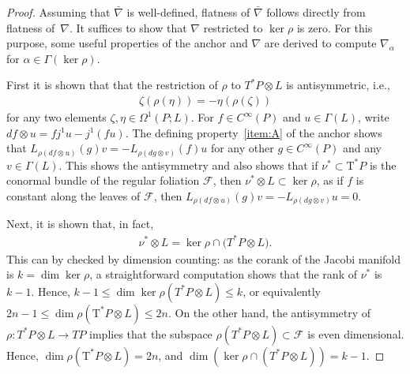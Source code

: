 \documentclass[pdftex]{sigma}
\numberwithin{equation}{section}
\newcommand{\cotan}{\mathrm{T}^*} %
\begin{document}
\begin{proof}Assuming that $\bar\nabla$ is well-def\/ined, f\/latness of $\bar\nabla$ follows directly from f\/latness of~$\nabla$. It suf\/f\/ices to show that $\nabla$ restricted to $\ker\rho$ is zero. For this purpose, some useful properties of the anchor and $\nabla$ are derived to compute $\nabla_\alpha$ for $\alpha\in\Gamma(\ker\rho)$.

First it is shown that that the restriction of $\rho$ to $T^*P\otimes L$ is antisymmetric, i.e.,
\begin{gather*}\zeta(\rho(\eta))=-\eta(\rho(\zeta))\end{gather*}
for any two elements $\zeta,\eta\in\Omega^{1}(P;L)$. For $f\in C^\infty(P)$ and $u\in\Gamma(L)$, write $df\otimes u=fj^1u-j^1(fu)$. The def\/ining property~\ref{item:A} of the anchor shows that $L_{\rho(df\otimes u)}(g)v=-L_{\rho(dg\otimes v)}(f)u$ for any other $g\in C^\infty(P)$ and any $v\in\Gamma(L)$. This shows the antisymmetry and also shows that if $\nu^*\subset \cotan P$ is the conormal bundle of the regular foliation $\mathcal{F}$, then $\nu^*\otimes L\subset\ker\rho$, as if $f$ is constant along the leaves of $\mathcal{F}$, then $L_{\rho(df\otimes u)}(g)v=-L_{\rho(dg\otimes v)}u=0.$

Next, it is shown that, in fact,
 \begin{gather*}\nu^*\otimes L=\ker\rho\cap \big(T^*P\otimes L\big).\end{gather*}
This can by checked by dimension counting: as the corank of the Jacobi manifold is $k=\dim\ker\rho$, a straightforward computation shows that the rank of $\nu^*$ is $k-1$. Hence, $k-1\leq \dim\ker\rho(T^*P\otimes L)\leq k$, or equivalently $ 2n - 1 \leq \dim \rho(\cotan P \otimes L) \leq 2n. $ On the other hand, the antisymmetry of $\rho\colon T^*P\otimes L\to TP$ implies that the subspace $\rho(T^*P\otimes L)\subset\mathcal{F}$ is even dimensional. Hence, $\dim \rho(\cotan P \otimes L)=2n$, and $\dim\left(\ker\rho\cap (T^*P\otimes L)\right)=k-1.$


\end{proof}
\end{document}

